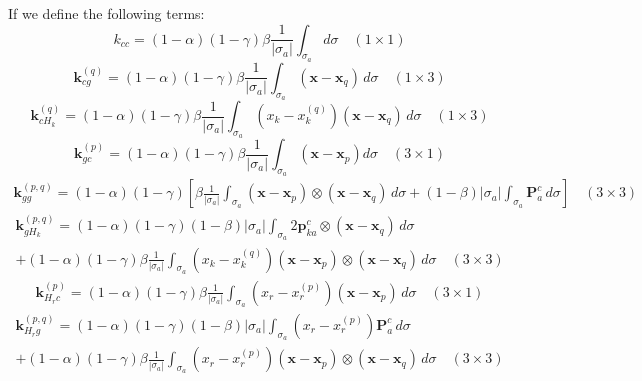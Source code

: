 \documentclass[11pt]{article} %
\begin{document}
If we define the following terms:
\begin{equation}
	k_{cc} = (1-\alpha) (1-\gamma) \beta \frac{1}{| \sigma_a |} \int_{\sigma_a} d \sigma \quad (1 \times 1)
\end{equation}
\begin{equation}
	\mathbf{k}_{cg}^{(q)} = (1-\alpha) (1-\gamma) \beta \frac{1}{| \sigma_a |} \int_{\sigma_a} (\mathbf{x} - \mathbf{x}_q) \, d \sigma \quad (1 \times 3)
\end{equation}
\begin{equation}
	\mathbf{k}_{cH_k}^{(q)} = (1-\alpha) (1-\gamma) \beta \frac{1}{| \sigma_a |} \int_{\sigma_a} (x_k - x^{(q)}_k) (\mathbf{x} - \mathbf{x}_q) \, d \sigma \quad (1 \times 3)
\end{equation}
\begin{equation}
	\mathbf{k}_{gc}^{(p)} = (1-\alpha) (1-\gamma) \beta \frac{1}{| \sigma_a |} \int_{\sigma_a} (\mathbf{x} - \mathbf{x}_p) d \sigma \quad (3 \times 1)
\end{equation}
\begin{eqnarray}
	\mathbf{k}_{gg}^{(p,q)} = (1-\alpha) (1-\gamma) \left[ \beta \frac{1}{| \sigma_a |} \int_{\sigma_a} (\mathbf{x} - \mathbf{x}_p) \otimes (\mathbf{x} - \mathbf{x}_q) \, d \sigma + (1-\beta) | \sigma_a | \int_{\sigma_a} \mathbf{P}^c_a \, d \sigma \right] \quad (3 \times 3)
\end{eqnarray}
\begin{eqnarray}
	\mathbf{k}_{gH_k}^{(p,q)} = (1-\alpha)(1-\gamma)(1-\beta) | \sigma_a | \int_{\sigma_a} 2 \mathbf{p}^c_{ka} \otimes (\mathbf{x} - \mathbf{x}_q) \, d \sigma \nonumber \\ + (1-\alpha) (1-\gamma) \beta \frac{1}{| \sigma_a |} \int_{\sigma_a} (x_k - x^{(q)}_k) (\mathbf{x} - \mathbf{x}_p) \otimes (\mathbf{x} - \mathbf{x}_q) \, d \sigma \quad (3 \times 3)
\end{eqnarray}
\begin{eqnarray}
	\mathbf{k}_{H_rc}^{(p)} = (1-\alpha) (1-\gamma) \beta \frac{1}{| \sigma_a |} \int_{\sigma_a} (x_r - x^{(p)}_r) (\mathbf{x} - \mathbf{x}_p) \, d \sigma \quad (3 \times 1)
\end{eqnarray}
\begin{eqnarray}
	\mathbf{k}_{H_rg}^{(p,q)} = (1-\alpha)(1-\gamma)(1-\beta) | \sigma_a | \int_{\sigma_a} (x_r - x^{(p)}_r) \mathbf{P}^c_a \, d \sigma \nonumber \\ + (1-\alpha) (1-\gamma) \beta \frac{1}{| \sigma_a |} \int_{\sigma_a} (x_r - x^{(p)}_r) (\mathbf{x} - \mathbf{x}_p) \otimes (\mathbf{x} - \mathbf{x}_q) \, d \sigma \quad (3 \times 3)
\end{eqnarray}
\end{document}
